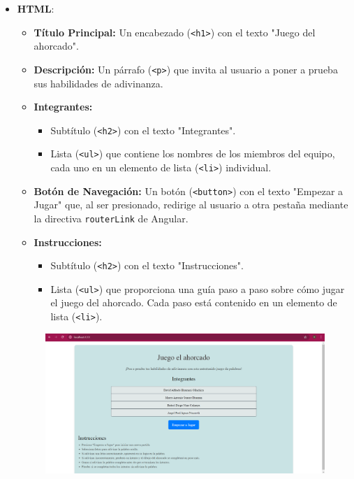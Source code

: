\documentclass{article}
\begin{document}
\begin{itemize}
    \item \textbf{HTML}:
    \begin{itemize}
        \item \textbf{Título Principal:} Un encabezado (\texttt{<h1>}) con el texto "Juego del ahorcado".
        \item \textbf{Descripción:} Un párrafo (\texttt{<p>}) que invita al usuario a poner a prueba sus habilidades de adivinanza.
        \item \textbf{Integrantes:} 
        \begin{itemize}
            \item Subtítulo (\texttt{<h2>}) con el texto "Integrantes".
            \item Lista (\texttt{<ul>}) que contiene los nombres de los miembros del equipo, cada uno en un elemento de lista (\texttt{<li>}) individual.
        \end{itemize}
        \item \textbf{Botón de Navegación:} Un botón (\texttt{<button>}) con el texto "Empezar a Jugar" que, al ser presionado, redirige al usuario a otra pestaña mediante la directiva \texttt{routerLink} de Angular.
        \item \textbf{Instrucciones:} 
        \begin{itemize}
            \item Subtítulo (\texttt{<h2>}) con el texto "Instrucciones".
            \item Lista (\texttt{<ul>}) que proporciona una guía paso a paso sobre cómo jugar el juego del ahorcado. Cada paso está contenido en un elemento de lista (\texttt{<li>}).
        \end{itemize}
    \end{itemize}
            \begin{figure}[h]
                \centering
                \includegraphics[width=1\textwidth]{img/home.png}

\end{figure}
\end{itemize}
\end{document}
